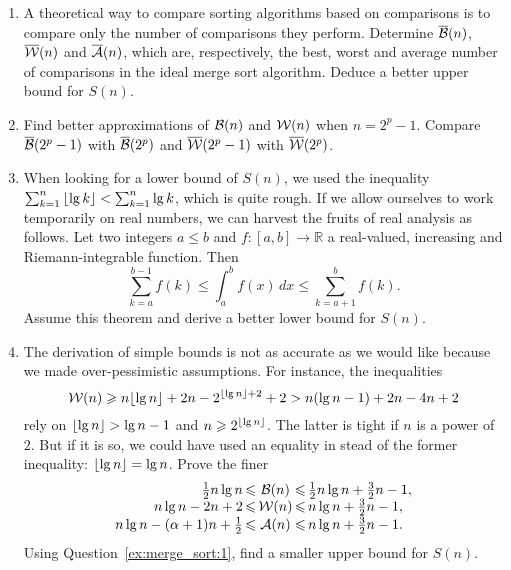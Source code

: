 \begin{enumerate}

  \item \label{ex:merge_sort:1} A theoretical way to compare sorting
    algorithms based on comparisons is to compare only the number of
    comparisons they perform. Determine \(\overline{\mathcal{B}}(n)\), \(\overline{\mathcal{W}}(n)\)
    and \(\overline{\mathcal{A}}(n)\), which are, respectively, the best, worst and
    average number of comparisons in the ideal merge sort
    algorithm. Deduce a better upper bound for \(S(n)\).

  \item \label{ex:merge_sort:2} Find better approximations of
    \(\mathcal{B}(n)\) and \(\mathcal{W}(n)\) when \(n=2^p-1\). Compare
    \(\overline{\mathcal{B}}(2^p-1)\) with \(\overline{\mathcal{B}}(2^p)\) and \(\overline{\mathcal{W}}(2^p-1)\) with
    \(\overline{\mathcal{W}}(2^p)\).

  \item \label{ex:merge_sort:3} When looking for a lower bound of
    \(S(n)\), we used the inequality \(\sum_{k=1}^{n}{\lfloor{\lg k}\rfloor} <
    \sum_{k=1}^{n}{\lg k}\), which is quite rough. If we allow
    ourselves to work temporarily on real numbers, we can harvest the
    fruits of real analysis as follows. Let two integers \(a \leqslant
    b\) and \(f:[a,b] \rightarrow \mathbb{R}\) a real\hyp{}valued,
    increasing and Riemann\hyp{}integrable function. Then
    \[
      \sum_{k=a}^{b-1}f(k) \leqslant \int_{a}^{b}{\!\!f(x)} \,dx
                         \leqslant \sum_{k=a+1}^{b}{\!\!\!f(k)}.
    \]
    Assume this theorem and derive a better lower bound for \(S(n)\).

  \item \label{ex:merge_sort:4} The derivation of simple bounds is not
    as accurate as we would like because we made over\hyp{}pessimistic
    assumptions. For instance, the inequalities
    \[
    \mathcal{W}(n) \geqslant n\lfloor{\lg n}\rfloor + 2n - 2^{\lfloor{\lg n}\rfloor+2} + 2
                       > n(\lg n - 1) + 2n - 4n + 2
    \]
    rely on \(\lfloor{\lg n}\rfloor > \lg n - 1\) and \(n \geqslant
    2^{\lfloor{\lg n}\rfloor}\). The latter is tight if \(n\) is a power of
    \(2\). But if it is so, we could have used an equality in stead of
    the former inequality: \(\lfloor{\lg n}\rfloor = \lg n\). Prove the finer
    \[
    \begin{array}{r@{\,}c@{\,}c@{\,}c@{\,}l}
    \frac{1}{2}{n\lg n} & \leqslant & \Bideal(n)
       & \leqslant & \tfrac{1}{2}{n \lg n} + \tfrac{3}{2}{n} - 1,\\
    n\lg n - 2n + 2 & \leqslant & \Wideal(n)
                    & \leqslant & n\lg n + \tfrac{3}{2}{n} - 1,\\[1pt]
    n\lg n - (\alpha + 1)n + \tfrac{1}{2} & \leqslant & \Aideal(n)
                               & \leqslant & n\lg n + \tfrac{3}{2}n - 1.
    \end{array}
    \]
    Using Question~\ref{ex:merge_sort:1}, find a smaller upper bound
    for \(S(n)\).


\end{enumerate}
